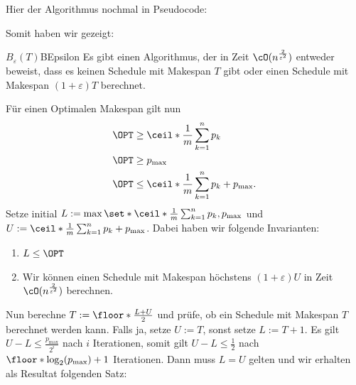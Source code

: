 \documentclass[language=ngerman,algolist]{TemplateLecture}
\begin{document}
Hier der Algorithmus nochmal in Pseudocode:
\begin{algorithm}
    \caption{$B_\varepsilon(T)$}\label{alg:BEpsilon}
    \begin{algorithmic}[1]
        \Else{} 
        \EndIf{}
    \end{algorithmic}
    
\end{algorithm}

Somit haben wir gezeigt:
\begin{lem}{$B_\varepsilon(T)$}{BEpsilon}
    Es gibt einen Algorithmus, der in Zeit $\cO(n^{\frac{2}{\varepsilon^2}})$ entweder beweist, dass es keinen Schedule mit Makespan $T$ gibt oder einen Schedule mit Makespan $(1+\varepsilon)T$ berechnet.
\end{lem}
Für einen Optimalen Makespan gilt nun
\begin{equation*}
    \begin{split}
        \OPT &\geq \ceil*{\frac{1}{m}\sum_{k=1}^n p_k} \\
        \OPT &\geq p_{\max} \\
        \OPT &\leq \ceil*{\frac{1}{m}\sum_{k=1}^n p_k} + p_{\max}.
    \end{split}
\end{equation*}
Setze initial $L := \max\set*{\ceil*{\frac{1}{m}\sum_{k=1}^n p_k}, p_{\max}}$ und $U := \ceil*{\frac{1}{m}\sum_{k=1}^n p_k} + p_{\max}$. Dabei haben wir folgende Invarianten:
\begin{enumerate}
    \item $L \leq \OPT$
    \item Wir können einen Schedule mit Makespan höchstens $(1+\varepsilon)U$ in Zeit $\cO(n^{\frac{2}{\varepsilon^2}})$ berechnen.
\end{enumerate}
Nun berechne $T := \floor*{\frac{L + U}{2}}$ und prüfe, ob ein Schedule mit Makespan $T$ berechnet werden kann. Falls ja, setze $U := T$, sonst setze $L := T + 1$. Es gilt $U - L \leq \frac{p_{\max}}{2^i}$ nach $i$ Iterationen, somit gilt $U - L \leq \frac{1}{2}$ nach $ \floor*{\log_2(p_{\max})}+1$ Iterationen. Dann muss $L = U$ gelten und wir erhalten als Resultat folgenden Satz:
\end{document}
